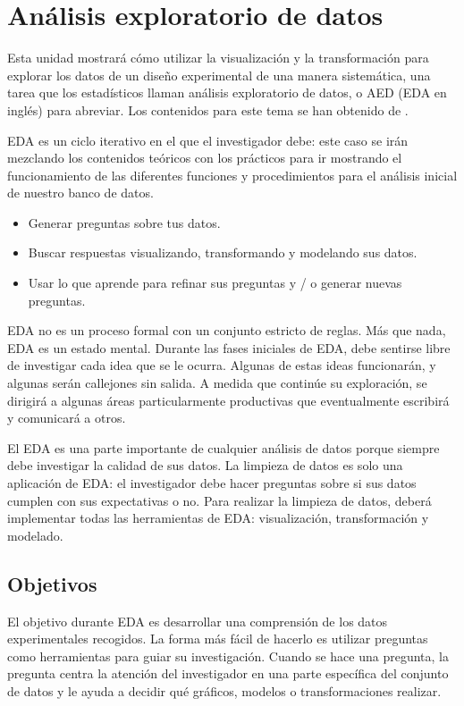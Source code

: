 \documentclass[
]{book}
\providecommand{\tightlist}{%
  \setlength{\itemsep}{0pt}\setlength{\parskip}{0pt}}
\begin{document}
\hypertarget{aed}{%
\chapter{Análisis exploratorio de datos}\label{aed}}

Esta unidad mostrará cómo utilizar la visualización y la transformación para explorar los datos de un diseño experimental de una manera sistemática, una tarea que los estadísticos llaman análisis exploratorio de datos, o AED (EDA en inglés) para abreviar. Los contenidos para este tema se han obtenido de \citet{HadleyGrolemund16}.

EDA es un ciclo iterativo en el que el investigador debe: este caso se irán mezclando los contenidos teóricos con los prácticos para ir mostrando el funcionamiento de las diferentes funciones y procedimientos para el análisis inicial de nuestro banco de datos.

\begin{itemize}
\tightlist
\item
  Generar preguntas sobre tus datos.
\item
  Buscar respuestas visualizando, transformando y modelando sus datos.
\item
  Usar lo que aprende para refinar sus preguntas y / o generar nuevas preguntas.
\end{itemize}

EDA no es un proceso formal con un conjunto estricto de reglas. Más que nada, EDA es un estado mental. Durante las fases iniciales de EDA, debe sentirse libre de investigar cada idea que se le ocurra. Algunas de estas ideas funcionarán, y algunas serán callejones sin salida. A medida que continúe su exploración, se dirigirá a algunas áreas particularmente productivas que eventualmente escribirá y comunicará a otros.

El EDA es una parte importante de cualquier análisis de datos porque siempre debe investigar la calidad de sus datos. La limpieza de datos es solo una aplicación de EDA: el investigador debe hacer preguntas sobre si sus datos cumplen con sus expectativas o no. Para realizar la limpieza de datos, deberá implementar todas las herramientas de EDA: visualización, transformación y modelado.

\hypertarget{objetivos}{%
\section{Objetivos}\label{objetivos}}

El objetivo durante EDA es desarrollar una comprensión de los datos experimentales recogidos. La forma más fácil de hacerlo es utilizar preguntas como herramientas para guiar su investigación. Cuando se hace una pregunta, la pregunta centra la atención del investigador en una parte específica del conjunto de datos y le ayuda a decidir qué gráficos, modelos o transformaciones realizar.
\end{document}
